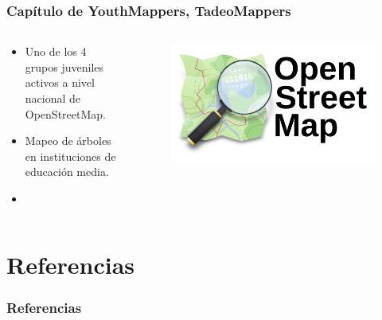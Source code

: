 \documentclass[17pt, t, lualatex]{beamer}
\begin{document}
\begin{frame}
  \frametitle{Capítulo de YouthMappers, TadeoMappers}
  \begin{columns}
    \begin{column}{.5\textwidth}
      \begin{itemize}
        \item Uno de los 4 grupos juveniles activos a nivel nacional de OpenStreetMap.
        \item Mapeo de árboles en instituciones de educación media.
        \item
      \end{itemize}
    \end{column}

    \begin{column}{.5\textwidth}
      \begin{figure}
        \centering
        \includegraphics[width=\texwidth]{img/OSM.png}
      \end{figure}
    \end{column}
  \end{columns}
\end{frame}

\section{Referencias}
\begin{frame}
  \frametitle{Referencias}
  \printbibliography

\end{frame}

\insertendpage
\end{document}
